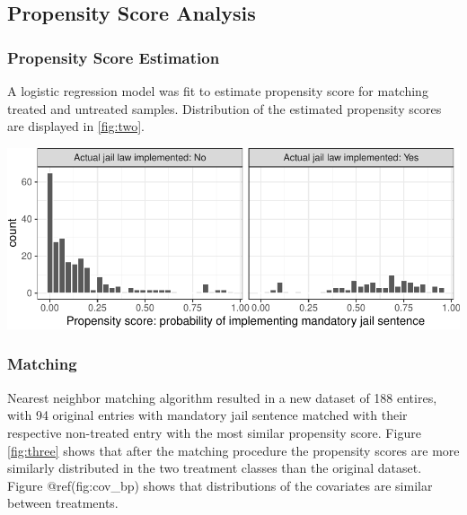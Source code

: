 \documentclass[]{article}
\let\origfigure\figure
\let\endorigfigure\endfigure
\renewenvironment{figure}[1][2] {
    \expandafter\origfigure\expandafter[H]
} {
    \endorigfigure
}
\begin{document}
\hypertarget{propensity-score-analysis-1}{%
\subsection{Propensity Score Analysis}\label{propensity-score-analysis-1}}

\hypertarget{propensity-score-estimation-1}{%
\subsubsection{Propensity Score Estimation}\label{propensity-score-estimation-1}}

A logistic regression model was fit to estimate propensity score for matching treated and untreated samples. Distribution of the estimated propensity scores are displayed in \ref{fig:two}.

\begin{figure}

{\centering \includegraphics{team6_final_project_3_files/figure-latex/two-1} 

}

\caption{Propensity score distribution across two treatment groups before matching}\label{fig:two}
\end{figure}

\hypertarget{matching-1}{%
\subsubsection{Matching}\label{matching-1}}

Nearest neighbor matching algorithm resulted in a new dataset of 188 entires, with 94 original entries with mandatory jail sentence matched with their respective non-treated entry with the most similar propensity score. Figure \ref{fig:three} shows that after the matching procedure the propensity scores are more similarly distributed in the two treatment classes than the original dataset. Figure @ref(fig:cov\_bp) shows that distributions of the covariates are similar between treatments.
\end{document}
